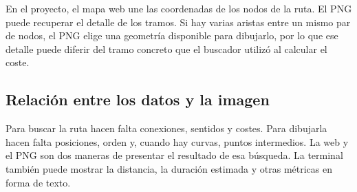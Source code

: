 \documentclass[11pt,a4paper]{article}
\begin{document}
En el proyecto, el mapa web une las coordenadas de los nodos de la ruta. El PNG puede recuperar el detalle de los tramos. Si hay varias aristas entre un mismo par de nodos, el PNG elige una geometría disponible para dibujarlo, por lo que ese detalle puede diferir del tramo concreto que el buscador utilizó al calcular el coste.

\subsection{Relación entre los datos y la imagen}

Para buscar la ruta hacen falta conexiones, sentidos y costes. Para dibujarla hacen falta posiciones, orden y, cuando hay curvas, puntos intermedios. La web y el PNG son dos maneras de presentar el resultado de esa búsqueda. La terminal también puede mostrar la distancia, la duración estimada y otras métricas en forma de texto.
\end{document}
